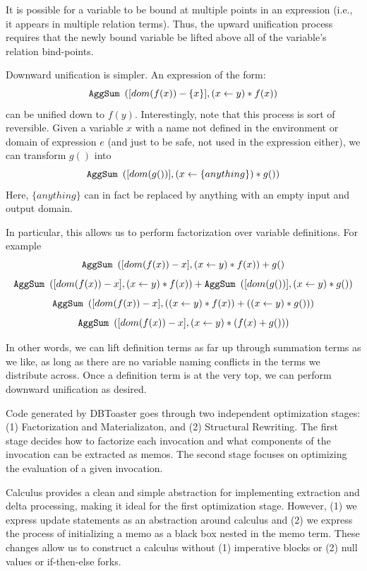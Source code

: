 \documentclass[11pt]{amsart}
\newcommand{\parsection}[1]{\smallskip\noindent{\bf #1.}}
\newcommand{\AggSum}{{\tt AggSum}\ }
\begin{document}
It is possible for a variable to be bound at multiple points in an expression (i.e., it appears in multiple relation terms).  Thus, the upward unification process requires that the newly bound variable be lifted above all of the variable's relation bind-points.

Downward unification is simpler.  An expression of the form:
$$\AggSum\left([dom(f(x)) - \{x\}], (x \gets y) * f(x)\right)$$
can be unified down to $f(y)$.  Interestingly, note that this process is sort of reversible.  Given a variable $x$ with a name not defined in the environment or domain of expression $e$ (and just to be safe, not used in the expression either), we can transform $g()$ into
$$\AggSum\left([dom(g())], (x \gets \{anything\}) * g()\right)$$
Here, $\{anything\}$ can in fact be replaced by anything with an empty input and output domain.

In particular, this allows us to perform factorization over variable definitions.  For example
$$\AggSum\left([dom(f(x)) - x], (x \gets y) * f(x)\right) + g()$$
$$\AggSum\left([dom(f(x)) - x], (x \gets y) * f(x)\right) + \AggSum\left([dom(g())], (x \gets y) * g()\right)$$
$$\AggSum\left([dom(f(x)) - x], ((x \gets y) * f(x)) + ((x \gets y) * g()) \right)$$
$$\AggSum\left([dom(f(x)) - x], (x \gets y) * (f(x) + g()) \right)$$

In other words, we can lift definition terms as far up through summation terms as we like, as long as there are no variable naming conflicts in the terms we distribute across.  Once a definition term is at the very top, we can perform downward unification as desired.

\parsection{Code-Level Optimizations}
Code generated by DBToaster goes through two independent optimization stages: (1) Factorization and Materializaton, and (2) Structural Rewriting.  The first stage decides how to factorize each invocation and what components of the invocation can be extracted as memos.  The second stage focuses on optimizing the evaluation of a given invocation.

Calculus provides a clean and simple abstraction for implementing extraction and  delta processing, making it ideal for the first optimization stage.  However, (1) we express update statements as an abstraction around calculus and (2) we express the process of initializing a memo as a black box nested in the memo term.  These changes allow us to construct a calculus without (1) imperative blocks or (2) null values or if-then-else forks.
\end{document}
